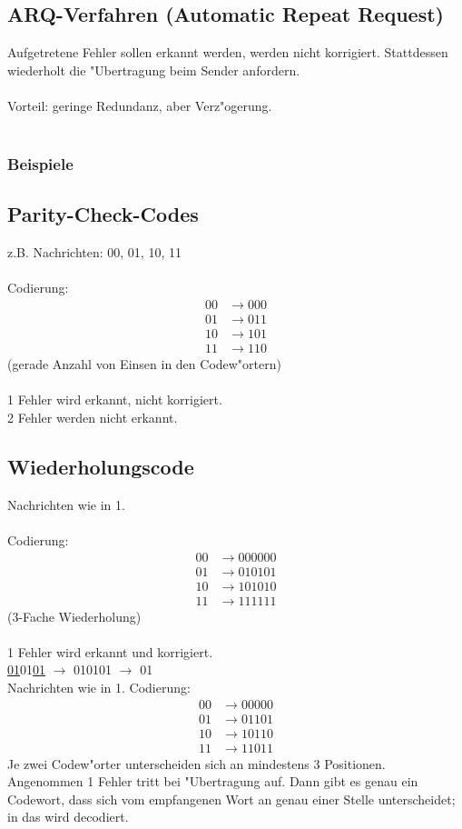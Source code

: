 \subsection{ARQ-Verfahren (Automatic Repeat Request)}
Aufgetretene Fehler sollen erkannt werden, werden nicht korrigiert. Stattdessen  wiederholt die "Ubertragung beim Sender anfordern.\\
\\
Vorteil: geringe Redundanz, aber Verz"ogerung.\\
\\
\subsubsection{Beispiele}
\subsection{Parity-Check-Codes}
z.B. Nachrichten: 00, 01, 10, 11\\
\\
Codierung:
\begin{align*}
	00 &\rightarrow 000\\
	01 &\rightarrow 011\\
	10 &\rightarrow 101\\
	11 &\rightarrow 110
\end{align*}
(gerade Anzahl von Einsen in den Codew"ortern)\\
\\
1 Fehler wird erkannt, nicht korrigiert.\\
2 Fehler werden nicht erkannt.

\subsection{Wiederholungscode}
Nachrichten wie in 1.\\
\\
Codierung:
\begin{align*}
	00 &\rightarrow 000000\\
	01 &\rightarrow 010101\\
	10 &\rightarrow 101010\\
	11 &\rightarrow 111111
\end{align*}	
(3-Fache Wiederholung)\\
\\
1 Fehler wird erkannt und korrigiert.\\
\underline{01}01\underline{01} $\rightarrow$ 010101 $\rightarrow$ 01 \\
Nachrichten wie in 1.
Codierung:
\begin{align*}
	00 &\rightarrow 00000\\
	01 &\rightarrow 01101\\
	10 &\rightarrow 10110\\
	11 &\rightarrow 11011
\end{align*}
Je zwei Codew"orter unterscheiden sich an mindestens 3 Positionen.\\
Angenommen 1 Fehler tritt bei "Ubertragung auf. Dann gibt es genau ein Codewort, dass sich vom empfangenen Wort an genau einer Stelle unterscheidet; in das wird decodiert.


